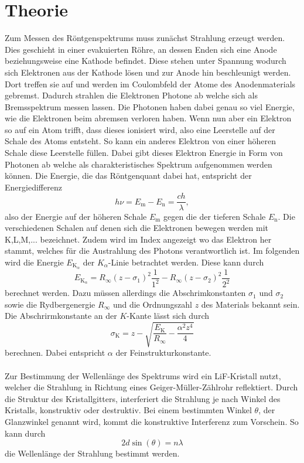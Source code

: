 \section{Theorie}
\label{sec:Theorie}

Zum Messen des Röntgenspektrums muss zunächst Strahlung erzeugt werden.
Dies geschieht in einer evakuierten Röhre, an dessen Enden sich eine Anode beziehungsweise eine Kathode befindet.
Diese stehen unter Spannung wodurch sich Elektronen aus der Kathode lösen und zur Anode hin beschleunigt werden.
Dort treffen sie auf und werden im Coulombfeld der Atome des Anodenmaterials gebremst.
Dadurch strahlen die Elektronen Photone ab welche sich als Bremsspektrum messen lassen.
Die Photonen haben dabei genau so viel Energie, wie die Elektronen beim abremsen verloren haben.
Wenn nun aber ein Elektron so auf ein Atom trifft, dass dieses ionisiert wird, also eine Leerstelle auf der Schale des Atoms entsteht.
So kann ein anderes Elektron von einer höheren Schale diese Leerstelle füllen.
Dabei gibt dieses Elektron Energie in Form von Photonen ab welche als charakteristisches Spektrum aufgenommen werden können.
Die Energie, die das Röntgenquant dabei hat, entspricht der Energiedifferenz 
\begin{equation}
    h \nu = E_ \text{m} - E_ \text{n} = \frac{ch}{\lambda},
    \label{eq:eng}
\end{equation}
also der Energie auf der höheren Schale $E_ \text{m}$ gegen die der tieferen Schale $E_\text{n}$.
Die verschiedenen Schalen auf denen sich die Elektronen bewegen werden mit K,L,M,... bezeichnet.
Zudem wird im Index angezeigt wo das Elektron her stammt, welches für die Austrahlung des Photons verantwortlich ist.
Im folgenden wird die Energie $E_ {\text{K}_{\alpha}}$ der $K_ \alpha$-Linie betrachtet werden.
Diese kann durch 
\begin{equation}
    E_ {\text{K}_{\alpha}} = R_ \infty (z - \sigma_1)^2 \frac{1}{1^2} - R_ \infty (z-\sigma_2)^2 \frac{1}{2^2}
    \label{eq:enkkante}
\end{equation}
berechnet werden.
Dazu müssen allerdings die Abschrimkonstanten $\sigma_1 $ und $\sigma_2$ sowie die Rydbergenergie $R_\infty$ und die Ordnungszahl $z$ des Materials bekannt sein.
Die Abschrirmkonstante an der $K$-Kante lässt sich durch 
\begin{equation}
    \sigma_ \text{K} = z - \sqrt{\frac{E_\text{K}}{R_\infty} - \frac{\alpha^2 z^4}{4}}
    \label{eq:sigma}
\end{equation}
berechnen.
Dabei entspricht $\alpha$ der Feinstrukturkonstante.
\\\\
Zur Bestimmung der Wellenlänge des Spektrums wird ein LiF-Kristall nutzt, welcher die Strahlung in Richtung eines Geiger-Müller-Zählrohr reflektiert.
Durch die Struktur des Kristallgitters, interferiert die Strahlung je nach Winkel des Kristalls, konstruktiv oder destruktiv.
Bei einem bestimmten Winkel $\theta$, der Glanzwinkel genannt wird, kommt die konstruktive Interferenz zum Vorschein.
So kann durch
\begin{equation}
    2d\sin(\theta) = n \lambda
    \label{eq:bragg}
\end{equation}
die Wellenlänge der Strahlung bestimmt werden.
